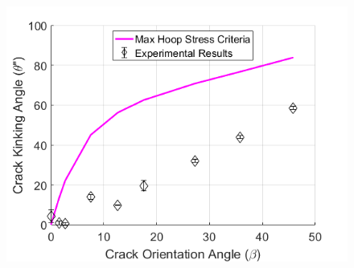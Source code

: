 \documentclass[12pt]{article}
\begin{document}
\begin{figure}[H]
	\centering
	\includegraphics[width=.67\textwidth,scale=1]{Goal3_b.png}
	\caption{}
	\label{fig:Goal3}
\end{figure}




\end{document}
